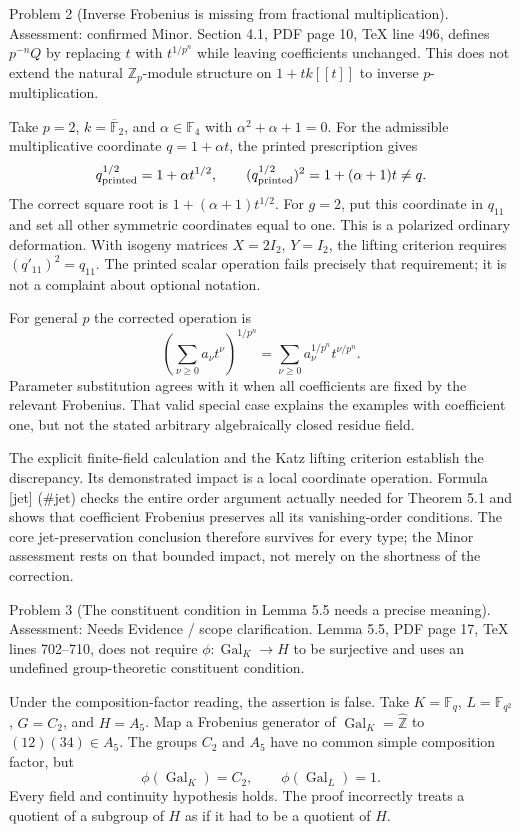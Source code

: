 \documentclass[10pt]{article}
\begin{document}
Problem 2 (Inverse Frobenius is missing from fractional multiplication).  Assessment: confirmed Minor. Section 4.1, PDF page 10, TeX line 496, defines \(p^{-n}Q\) by replacing \(t\) with \(t^{1/p^n}\) while leaving coefficients unchanged. This does not extend the natural \(\mathbb Z_p\)-module structure on \(1+t k[[t]]\) to inverse \(p\)-multiplication.\par
Take \(p=2\), \(k=\overline{\mathbb F}_2\), and \(\alpha\in\mathbb F_4\) with \(\alpha^2+\alpha+1=0\). For the admissible multiplicative coordinate \(q=1+\alpha t\), the printed prescription gives \[q_{\rm printed}^{1/2}=1+\alpha t^{1/2},\qquad
  (q_{\rm printed}^{1/2})^2=1+(\alpha+1)t\ne q.\] The correct square root is \(1+(\alpha+1)t^{1/2}\). For \(g=2\), put this coordinate in \(q_{11}\) and set all other symmetric coordinates equal to one. This is a polarized ordinary deformation. With isogeny matrices \(X=2I_2\), \(Y=I_2\), the lifting criterion requires \((q'_{11})^2=q_{11}\). The printed scalar operation fails precisely that requirement; it is not a complaint about optional notation.\par
For general \(p\) the corrected operation is \[\left(\sum_{\nu\geq0}a_\nu t^\nu\right)^{1/p^n}
       =\sum_{\nu\geq0}a_\nu^{1/p^n}t^{\nu/p^n}.\] Parameter substitution agrees with it when all coefficients are fixed by the relevant Frobenius. That valid special case explains the examples with coefficient one, but not the stated arbitrary algebraically closed residue field.\par
The explicit finite-field calculation and the Katz lifting criterion establish the discrepancy. Its demonstrated impact is a local coordinate operation. Formula [jet] (\#jet) checks the entire order argument actually needed for Theorem 5.1 and shows that coefficient Frobenius preserves all its vanishing-order conditions. The core jet-preservation conclusion therefore survives for every type; the Minor assessment rests on that bounded impact, not merely on the shortness of the correction.\par
Problem 3 (The constituent condition in Lemma 5.5 needs a precise meaning).  Assessment: Needs Evidence / scope clarification. Lemma 5.5, PDF page 17, TeX lines 702–710, does not require \(\phi:\operatorname{Gal}_K\to H\) to be surjective and uses an undefined group-theoretic constituent condition.\par
Under the composition-factor reading, the assertion is false. Take \(K=\mathbb F_q\), \(L=\mathbb F_{q^2}\), \(G=C_2\), and \(H=A_5\). Map a Frobenius generator of \(\operatorname{Gal}_K=\widehat{\mathbb Z}\) to \((12)(34)\in A_5\). The groups \(C_2\) and \(A_5\) have no common simple composition factor, but \[\phi(\operatorname{Gal}_K)=C_2,\qquad \phi(\operatorname{Gal}_L)=1.\] Every field and continuity hypothesis holds. The proof incorrectly treats a quotient of a subgroup of \(H\) as if it had to be a quotient of \(H\).\par
\end{document}
